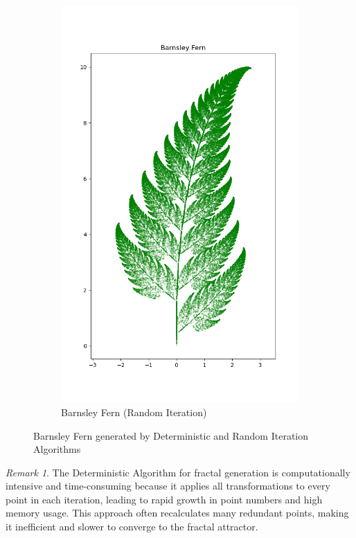 \documentclass[a4paper,11pt, titlepage]{article}
\theoremstyle{definition}
\theoremstyle{plain}
\theoremstyle{remark}
\newtheorem*{remark}{Remark}
\theoremstyle{definition}
\begin{document}
\begin{figure}[h]
\begin{subfigure}[b]{0.45\textwidth}
        \includegraphics[width=\textwidth]{barnsley_fern_random.png}
        \caption{Barnsley Fern (Random Iteration)}
        \label{fig:fern_random}
    \end{subfigure}
    \caption{Barnsley Fern generated by Deterministic and Random Iteration Algorithms}
    \label{fig:fern_comparison}
\end{figure}

\begin{remark}
    The Deterministic Algorithm for fractal generation is computationally intensive and time-consuming because it applies all transformations to every point in each iteration, leading to rapid growth in point numbers and high memory usage. This approach often recalculates many redundant points, making it inefficient and slower to converge to the fractal attractor.
\end{remark}
\end{document}
